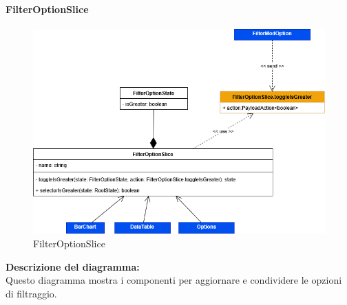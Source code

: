 \pagebreak

\paragraph{FilterOptionSlice}
\begin{figure}[h!] \centering
      \includegraphics[scale=0.45]{template/images/uml_front/logic/FilterOptionSlice.png}
      \caption{FilterOptionSlice}
\end{figure}
\textbf{Descrizione del diagramma:}\\
Questo diagramma mostra i componenti per aggiornare e condividere le opzioni di filtraggio.
